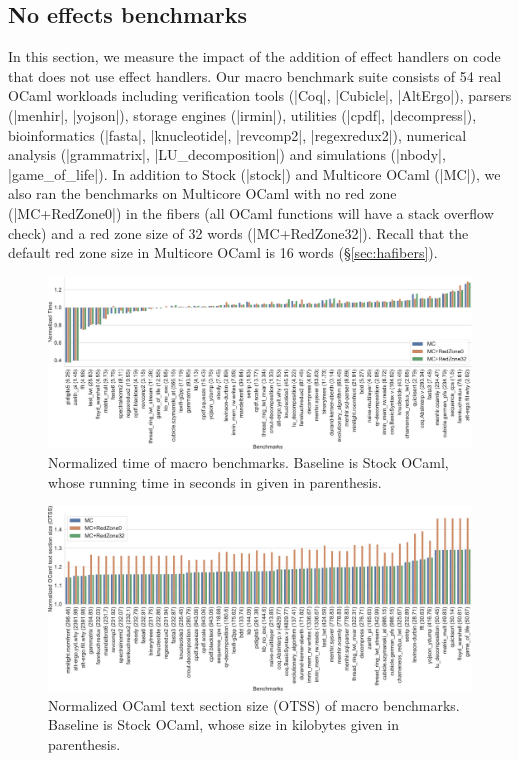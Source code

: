\documentclass[sigplan,screen]{acmart}
\begin{document}
\subsection{No effects benchmarks}

In this section, we measure the impact of the addition of effect handlers on
code that does not use effect handlers. Our macro benchmark suite consists of
54 real OCaml workloads including verification tools (|Coq|, |Cubicle|,
|AltErgo|), parsers (|menhir|, |yojson|), storage engines (|irmin|), utilities
(|cpdf|, |decompress|), bioinformatics (|fasta|, |knucleotide|, |revcomp2|,
|regexredux2|), numerical analysis (|grammatrix|, |LU_decomposition|) and
simulations (|nbody|, |game_of_life|). In addition to Stock (|stock|) and
Multicore OCaml (|MC|), we also ran the benchmarks on Multicore OCaml with no
red zone (|MC+RedZone0|) in the fibers (all OCaml functions will have a stack
overflow check) and a red zone size of 32 words (|MC+RedZone32|). Recall that
the default red zone size in Multicore OCaml is 16 words (\S\ref{sec:hafibers}).

\begin{figure}
	\includegraphics[scale=0.35]{sandmark-notebook/sandmark_time}
	\caption{Normalized time of macro benchmarks. Baseline is Stock OCaml,
		whose running time in seconds in given in parenthesis.}
	\label{res:macro_time}
\end{figure}

\begin{figure}
	\includegraphics[scale=0.35]{sandmark-notebook/sandmark_codesize}
	\caption{Normalized OCaml text section size (OTSS) of macro benchmarks.
	Baseline is Stock OCaml, whose size in kilobytes given in parenthesis.}
	\label{res:macro_size}
\end{figure}
\end{document}
